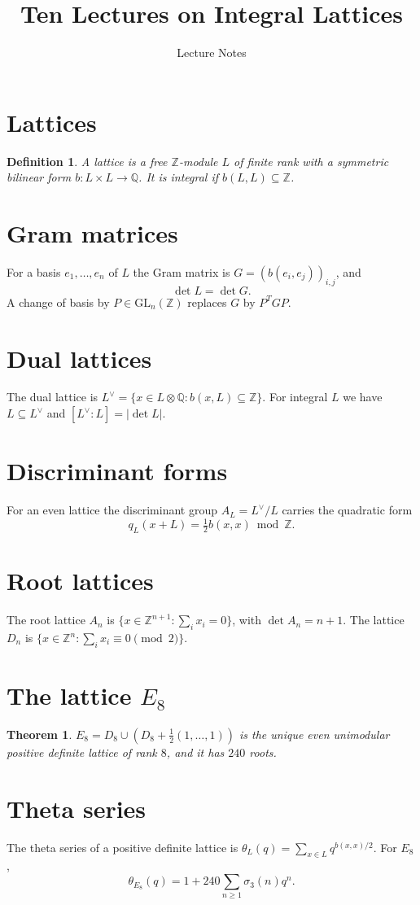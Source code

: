 \documentclass{article}
\title{Ten Lectures on Integral Lattices}
\author{Lecture Notes}
\date{}
\newtheorem{theorem}{Theorem}
\newtheorem{definition}{Definition}
\begin{document}
\maketitle
\section{Lattices}
\begin{definition}
A lattice is a free $\mathbb{Z}$-module $L$ of finite rank with a symmetric bilinear form
$b \colon L \times L \to \mathbb{Q}$. It is integral if $b(L, L) \subseteq \mathbb{Z}$.
\end{definition}
\newpage
\section{Gram matrices}
For a basis $e_1, \dots, e_n$ of $L$ the Gram matrix is $G = (b(e_i, e_j))_{i,j}$, and
\[ \det L = \det G. \]
A change of basis by $P \in \mathrm{GL}_n(\mathbb{Z})$ replaces $G$ by $P^{T} G P$.
\newpage
\section{Dual lattices}
The dual lattice is $L^\vee = \{ x \in L \otimes \mathbb{Q} : b(x, L) \subseteq \mathbb{Z} \}$.
For integral $L$ we have $L \subseteq L^\vee$ and $[L^\vee : L] = |\det L|$.
\newpage
\section{Discriminant forms}
For an even lattice the discriminant group $A_L = L^\vee / L$ carries the quadratic form
\[ q_L(x + L) = \tfrac{1}{2} b(x, x) \bmod \mathbb{Z}. \]
\newpage
\section{Root lattices}
The root lattice $A_n$ is $\{ x \in \mathbb{Z}^{n+1} : \sum_i x_i = 0 \}$, with
$\det A_n = n + 1$. The lattice $D_n$ is $\{ x \in \mathbb{Z}^n : \sum_i x_i \equiv 0 \pmod 2 \}$.
\newpage
\section{The lattice $E_8$}
\begin{theorem}
$E_8 = D_8 \cup (D_8 + \tfrac{1}{2}(1, \dots, 1))$ is the unique even unimodular positive
definite lattice of rank $8$, and it has $240$ roots.
\end{theorem}
\newpage
\section{Theta series}
The theta series of a positive definite lattice is $\theta_L(q) = \sum_{x \in L} q^{b(x,x)/2}$.
For $E_8$,
\[ \theta_{E_8}(q) = 1 + 240 \sum_{n \geq 1} \sigma_3(n) q^n. \]
\newpage
\end{document}
